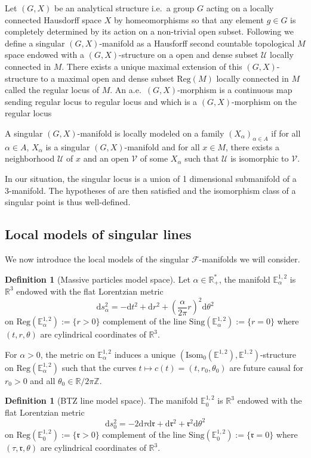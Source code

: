 \documentclass[a4paper,12pt]{article}
\def\ZZ{\mathbb{Z}}
\def\r{\mathfrak{r}}
\def\U{\mathcal U}
\def\isom{Isom}
\def\V{\mathcal V}
\def\d{\mathrm{d}}
\def\sing{\mathrm{Sing}}
\def\RR{\mathbb{R}}
\newcommand{\mass}[1]{{\mathbb E}^{1,2}_{#1}}
\def\isom{\mathrm{Isom}}
\def\Reg{\mathrm{Reg}}
\def\reg{\Reg}
\def\V{\mathcal V}
\def\Future{\mathcal F}
\def\sing{\mathrm{Sing}}
\def\isom{\mathrm{Isom}}
\def\d{\mathrm{d}}
\def\reg{\mathrm{Reg}}
\def\U{\mathcal{U}}
\def\Reg{\mathrm{Reg}}
\def\r{\mathfrak{r}}
\def\sing{\mathrm{Sing}}
\def\GG{\isom_0(\mass{})}
\theoremstyle{definition}
\newtheorem{defi}[lem]{Definition}	%
\begin{document}
		Let $(G,X)$ be an analytical structure i.e.\ a group $G$ acting on a locally connected Hausdorff space $X$ by homeomorphisms so that any element $g\in G$ is completely determined by its action on a non-trivial open subset. Following \cite{GXramcover} we define a singular $(G,X)$-manifold as a Hausforff second countable topological $M$ space endowed with a $(G,X)$-structure on a open and dense subset $\U$ locally connected in $M$. There exists a unique maximal extension of this $(G,X)$-structure to a maximal open and dense subset $\reg(M)$ locally connected in $M$ called the regular locus of $M$.
		An a.e.\ $(G,X)$-morphism is a continuous map sending regular locus to regular locus and which is a $(G,X)$-morphism on the regular locus 
		
		A singular $(G,X)$-manifold is locally modeled on a family $(X_\alpha)_{\alpha\in A}$ if for all $\alpha\in A$, $X_\alpha$ is a singular $(G,X)$-manifold and for all $x\in M$, there exists a neighborhood $\U$ of $x$ and an open $\V$ of some $X_\alpha$ such that $\U$ is isomorphic to $\V$.
		
		In our situation, the singular locus is a union of 1 dimensional submanifold of a 3-manifold. The hypotheses of \cite{GXramcover} are then satisfied and the isomorphism class of a singular point is thus well-defined.
		
		\subsection{Local models of singular lines}
		
			We now introduce the local models of the singular $\Future$-manifolds we will consider.
			\begin{defi}[Massive particles model space]\label{def:massive_particles_model_space}
		 Let $\alpha\in \RR_+^*$, the manifold $\mass{\alpha}$ is $\RR^3$ endowed with the flat Lorentzian metric $$\d s_\alpha ^2 = -\d t^2+\d r^2+\left(\frac{\alpha}{2\pi} r\right)^2 \d \theta^2$$ on $\reg(\mass{\alpha}):=\{r>0\}$ complement of the line $\sing(\mass{\alpha}):=\{r=0\}$ where $(t,r,\theta)$ are cylindrical coordinates of $\RR^3$. 
		\end{defi}

		For $\alpha>0$, the metric on $\mass{\alpha}$ induces a unique $(\GG,\mass{})$-structure on $\reg(\mass{\alpha})$ such that the curves $t\mapsto c(t)=(t,r_0,\theta_0)$ are future causal for $r_0>0$ and all $\theta_0\in \RR/2\pi\ZZ$.
		\begin{defi}[BTZ line model space]\label{def:btz_line_model_space}
		 The manifold $\mass{0}$ is $\RR^3$ endowed with the flat Lorentzian metric $$\d s_0 ^2 = -2\d \tau \d \r+\d \r^2+ \r^2\d \theta^2$$ on $\reg(\mass{0}):=\{\r>0\}$ complement of the line $\sing(\mass{0}):=\{\r=0\}$ where $(\tau,\r,\theta)$ are cylindrical coordinates of $\RR^3$. 
		\end{defi}
		
\end{document}
